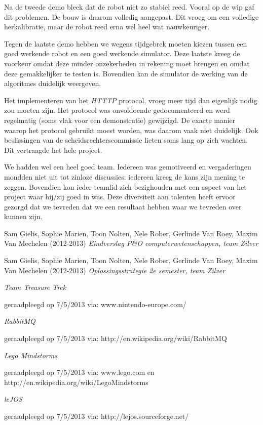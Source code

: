\documentclass[eind]{penoverslag}
\begin{document}
Na de tweede demo bleek dat de robot niet zo stabiel reed. Vooral op de wip gaf dit problemen. De bouw is daarom volledig aangepast. Dit vroeg om een volledige herkalibratie, maar de robot reed erna wel heel wat nauwkeuriger.

Tegen de laatste demo hebben we wegens tijdgebrek moeten kiezen tussen een goed werkende robot en een goed werkende simulator. Deze laatste kreeg de voorkeur omdat deze minder onzekerheden in rekening moet brengen en omdat deze gemakkelijker te testen is. Bovendien kan de simulator de werking van de algoritmes duidelijk weergeven.

Het implementeren van het \textit{HTTTP} protocol, vroeg meer tijd dan eigenlijk nodig zou moeten zijn. Het protocol was onvoldoende gedocumenteerd en werd regelmatig (soms vlak voor een demonstratie) gewijzigd. De exacte manier waarop het protocol gebruikt moest worden, was daarom vaak niet duidelijk. Ook beslissingen van de scheidsrechterscommissie lieten soms lang op zich wachten. Dit vertraagde het hele project.

We hadden wel een heel goed team. Iedereen was gemotiveerd en vergaderingen mondden niet uit tot zinloze discussies: iedereen kreeg de kans zijn mening te zeggen. Bovendien kon ieder teamlid zich bezighouden met een aspect van het project waar hij/zij goed in was. Deze diversiteit aan talenten heeft ervoor gezorgd dat we tevreden dat we een resultaat hebben waar we tevreden over kunnen zijn.

\begin{flushleft}
\begin{thebibliography}{9}

Sam Gielis, Sophie Marien, Toon Nolten, Nele Rober, Gerlinde Van Roey, Maxim Van Mechelen (2012-2013) \textit{Eindverslag P\&O computerwetenschappen, team Zilver}

Sam Gielis, Sophie Marien, Toon Nolten, Nele Rober, Gerlinde Van Roey, Maxim Van Mechelen (2012-2013) \textit{Oplossingsstrategie 2e semester, team Zilver}

\textit{Team Treasure Trek}
\begin{scriptsize}
geraadpleegd op 7/5/2013 via: \mbox{www.nintendo-europe.com/}
\end{scriptsize}

\textit{RabbitMQ}
\begin{scriptsize}
geraadpleegd op 7/5/2013 via: \mbox{http://en.wikipedia.org/wiki/RabbitMQ}
\end{scriptsize}

\textit{Lego Mindstorms}
\begin{scriptsize}
geraadpleegd op 7/5/2013 via: \mbox{www.lego.com} en \mbox{http://en.wikipedia.org/wiki/Lego\textendash Mindstorms}
\end{scriptsize}

\textit{leJOS}
\begin{scriptsize}
geraadpleegd op 7/5/2013 via: \mbox{http://lejos.sourceforge.net/}
\end{scriptsize}

\end{thebibliography}
\end{flushleft}
\end{document}
